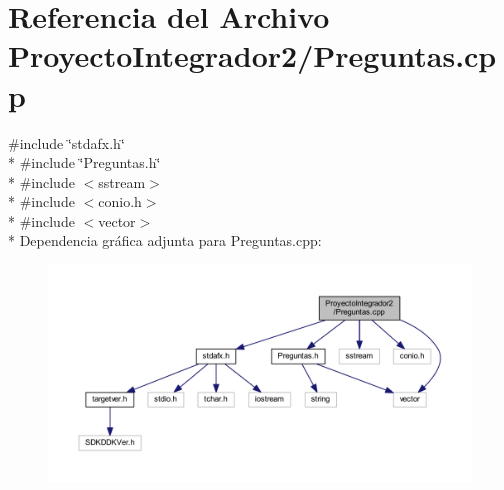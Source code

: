 \section{Referencia del Archivo Proyecto\-Integrador2/\-Preguntas.cpp}
\label{_preguntas_8cpp}
{\ttfamily \#include \char`\"{}stdafx.\-h\char`\"{}}\\*
{\ttfamily \#include \char`\"{}Preguntas.\-h\char`\"{}}\\*
{\ttfamily \#include $<$sstream$>$}\\*
{\ttfamily \#include $<$conio.\-h$>$}\\*
{\ttfamily \#include $<$vector$>$}\\*
Dependencia gráfica adjunta para Preguntas.\-cpp\-:
\nopagebreak
\begin{figure}[H]
\begin{center}
\leavevmode
\includegraphics[width=350pt]{_preguntas_8cpp__incl}
\end{center}
\end{figure}
